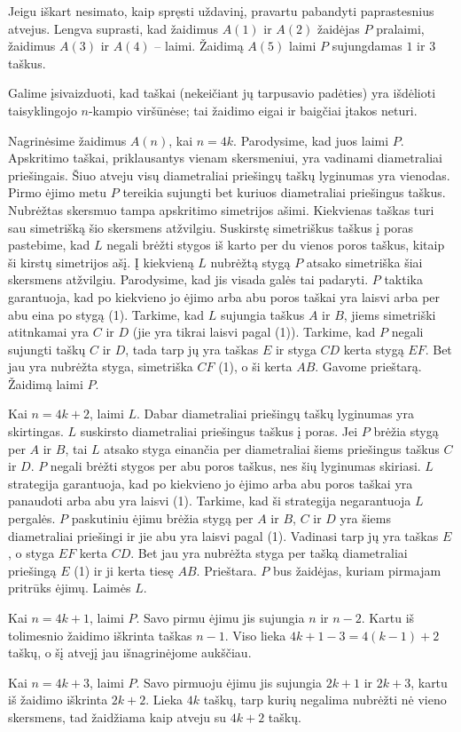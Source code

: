 \begin{sprendimas}
  Jeigu iškart nesimato, kaip spręsti uždavinį, pravartu pabandyti
  paprastesnius atvejus. Lengva suprasti, kad žaidimus $A(1)$ ir $A(2)$
  žaidėjas $P$ pralaimi, žaidimus $A(3)$ ir $A(4)$ – laimi. Žaidimą $A(5)$
  laimi $P$ sujungdamas $1$ ir $3$ taškus. 

  Galime įsivaizduoti, kad taškai (nekeičiant jų tarpusavio padėties) yra
  išdėlioti taisyklingojo $n$-kampio viršūnėse; tai žaidimo eigai ir baigčiai
  įtakos neturi.

  Nagrinėsime žaidimus $A(n)$, kai $n=4k$. Parodysime, kad juos laimi $P$.
  Apskritimo taškai, priklausantys vienam skersmeniui, yra vadinami
  diametraliai priešingais. Šiuo atveju visų diametraliai priešingų taškų
  lyginumas yra vienodas. Pirmo ėjimo metu $P$ tereikia sujungti bet kuriuos
  diametraliai priešingus taškus. Nubrėžtas skersmuo tampa apskritimo
  simetrijos ašimi. Kiekvienas taškas turi sau simetrišką šio skersmens
  atžvilgiu. Suskirstę simetriškus taškus į poras pastebime, kad $L$ negali
  brėžti stygos iš karto per du vienos poros taškus, kitaip ši kirstų
  simetrijos ašį. Į kiekvieną $L$ nubrėžtą stygą $P$ atsako simetriška šiai
  skersmens atžvilgiu. Parodysime, kad jis visada galės tai padaryti. $P$
  taktika garantuoja, kad po kiekvieno jo ėjimo arba abu poros taškai yra
  laisvi arba per abu eina po stygą (1). Tarkime, kad $L$ sujungia taškus $A$
  ir $B$, jiems simetriški atitnkamai yra $C$ ir $D$ (jie yra tikrai laisvi
  pagal (1)).  Tarkime, kad $P$ negali sujungti taškų $C$ ir $D$, tada tarp
  jų yra taškas $E$ ir styga $CD$ kerta stygą $EF$. Bet jau yra nubrėžta
  styga, simetriška $CF$ (1), o ši kerta $AB$. Gavome prieštarą. Žaidimą
  laimi $P$. 

  Kai $n=4k+2$, laimi $L$. Dabar diametraliai priešingų taškų lyginumas yra
  skirtingas. $L$ suskirsto diametraliai priešingus taškus į poras. Jei $P$
  brėžia stygą per $A$ ir $B$, tai $L$ atsako styga einančia per diametraliai šiems
  priešingus taškus $C$ ir $D$. $P$ negali brėžti stygos per abu poros taškus, nes šių
  lyginumas skiriasi. $L$ strategija garantuoja, kad po kiekvieno jo ėjimo arba
  abu poros taškai yra panaudoti arba abu yra laisvi (1). Tarkime, kad ši
  strategija negarantuoja $L$ pergalės. $P$ paskutiniu ėjimu brėžia stygą per
  $A$ ir $B$, $C$ ir $D$ yra šiems diametraliai priešingi ir jie abu
  yra laisvi pagal (1). Vadinasi tarp jų yra taškas $E$, o styga $EF$ kerta $CD$.
  Bet jau yra nubrėžta styga per tašką diametraliai priešingą $E$ (1) ir ji
  kerta tiesę $AB$. Prieštara. $P$ bus žaidėjas, kuriam pirmajam pritrūks ėjimų.
  Laimės $L$.

  Kai $n=4k+1$, laimi $P$. Savo pirmu ėjimu jis sujungia $n$ ir $n-2$. Kartu
  iš tolimesnio žaidimo iškrinta taškas $n-1$. Viso lieka $4k+1-3=4(k-1)+2$
  taškų, o šį atvejį jau išnagrinėjome aukščiau. 

  Kai $n=4k+3$, laimi $P$. Savo pirmuoju ėjimu jis sujungia $2k+1$ ir $2k+3$,
  kartu iš žaidimo iškrinta $2k+2$. Lieka $4k$ taškų, tarp kurių negalima
  nubrėžti nė vieno skersmens, tad žaidžiama kaip atveju su $4k+2$ taškų. 
\end{sprendimas}

